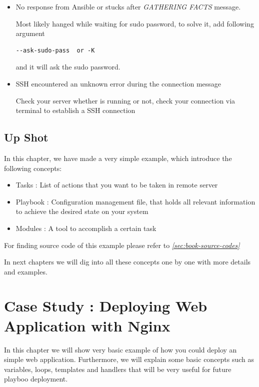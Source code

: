 \documentclass[10pt]{book}
\newcommand*{\fullref}[1]{\hyperref[{#1}]{\autoref*{#1} \nameref*{#1}}}
\begin{document}
\begin{itemize}
\item No response from Ansible or stucks after \textit{GATHERING FACTS} message.

Most likely hanged while waiting for sudo password, to solve it, add following argument 
\begin{Verbatim}
--ask-sudo-pass  or -K
\end{Verbatim}
and it will ask the sudo password.

\item SSH encountered an unknown error during the connection message

Check your server whether is running or not, check your connection via 
terminal to establish a SSH connection
\end{itemize}


\section{Up Shot}
In this chapter, we have made a very simple example, which introduce the 
following concepts:

\begin{itemize}
\item Tasks : List of actions that you want to be taken in remote server
\item Playbook : Configuration management file, that holds all relevant 
information to achieve the desired state on your system
\item Modules : A tool to accomplish a certain task
\end{itemize}

For finding source code of this example please refer to \emph{\fullref{sec:book-source-codes}}

In next chapters we will dig into all these concepts one by one with more 
details and examples.


 
 


\chapter{Case Study : Deploying Web Application with Nginx}
\label{chap-deploying-web-application-with-nginx}
In this chapter we will show very basic example of how you could deploy an 
simple web application. Furthermore, we will explain some basic concepts such as 
variables, loops, templates and handlers that will be very useful for future 
playboo deployment.
\end{document}
